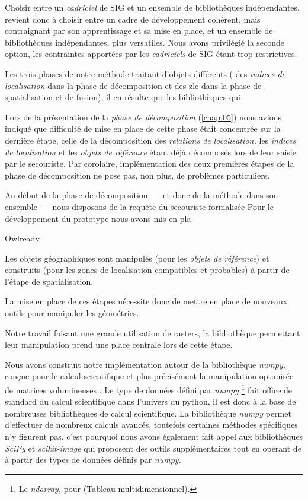 Choisir entre un \emph{cadriciel} de SIG et un ensemble de
bibliothèques indépendantes, revient donc à choisir entre un cadre de
développement cohérent, mais contraignant par son apprentissage et sa
mise en place, et un ensemble de bibliothèques indépendantes, plus
versatiles. Nous avons privilégié la seconde option, les contraintes
apportées par les \emph{cadriciels} de SIG étant trop restrictives.

Les trois phases de notre méthode traitant d'objets différents (\ie
des \emph{indices de localisation} dans la phase de décomposition et
des \ac{zlc} dans la phase de spatialisation et de fusion), il en
résulte que les bibliothèques qui 


Lors de la présentation de la \emph{phase de décomposition}
(\autoref{chap:05}) nous avions indiqué que difficulté de mise en
place de cette phase était concentrée sur la dernière étape, celle de
la décomposition des \emph{relations de localisation,} les
\emph{indices de localisation} et les \emph{objets de référence} étant
déjà décomposés lors de leur saisie par le secouriste. Par corolaire,
implémentation des deux premières étapes de la phase de décomposition
ne pose pas, non plus, de problèmes particuliers.

Au début de la phase de décomposition ---~et donc de la méthode dans
son ensemble~--- nous disposons de la requête du secouriste
formalisée
%
Pour le développement du prototype nous avons mis en pla


Owlready \autocite{Lamy2017}


Les objets géographiques sont manipulés (pour les \emph{objets de
  référence}) et construits (pour les zones de localisation
compatibles et probables) à partir de l'étape de spatialisation.

La mise en place de ces étapes nécessite donc de mettre en place de
nouveaux outils pour manipuler les géométries.

Notre travail faisant une grande utilisation de rasters, la
bibliothèque permettant leur manipulation prend une place centrale
lors de cette étape.

Nous avons construit notre implémentation autour de la bibliothèque
\emph{numpy,} conçue pour le calcul scientifique et plus précisément
la manipulation optimisée de matrices volumineuses
\autocite{vanderWalt2011}. Le type de données défini par \emph{numpy}
\footnote{Le \emph{ndarray,} pour
   (Tableau
  multidimensionnel).} fait office de standard du calcul scientifique
dans l'univers du python, il est donc à la base de nombreuses
bibliothèques de calcul scientifique.  La bibliothèque \emph{numpy}
permet d'effectuer de nombreux calculs avancés, toutefois certaines
méthodes spécifiques n'y figurent pas, c'est pourquoi nous avons
également fait appel aux bibliothèques \emph{SciPy} et
\emph{scikit-image} \autocite{vanderWalt2014,Virtanen2020} qui
proposent des outils supplémentaires tout en opérant de à partir des
types de données définis par \emph{numpy.}



